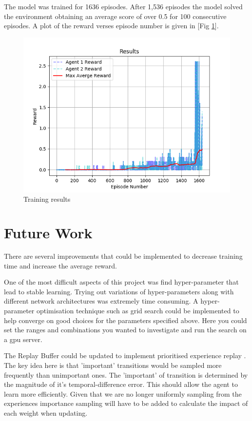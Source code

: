\documentclass[12pt]{article}
\begin{document}
The model was trained for 1636 episodes. 
After 1,536 episodes the model solved the environment obtaining an average score of over 0.5 for 100 consecutive episodes.
A plot of the reward verses episode number is given in [Fig \ref{results}].

\begin{figure}
	\centering
	\includegraphics[width=0.8\linewidth]{./img/Results.png}
	\caption{Training results}
	\label{results}
\end{figure}


\section{Future Work}
There are several improvements that could be implemented to decrease training time and increase the average reward.

One of the most difficult aspects of this project was find hyper-parameter that lead to stable learning.
Trying out variations of hyper-parameters along with different network architectures was extremely time consuming.
A hyper-parameter optimisation technique such as grid search could be implemented to help converge on good choices for the parameters 
specified above. 
Here you could set the ranges and combinations you wanted to investigate and run the search on a gpu server.

The Replay Buffer could be updated to implement prioritised experience replay \cite{per_paper}. 
The key idea here is that 'important' transitions would be sampled more frequently than unimportant ones. 
The 'important' of transition is determined by the magnitude of it's temporal-difference error.
This should allow the agent to learn more efficiently. 
Given that we are no longer uniformly sampling from the experiences importance sampling will have to be added to calculate the impact of each weight when updating.

\printbibliography
\end{document}

